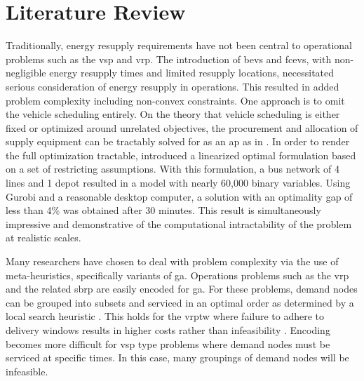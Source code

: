 \section{Literature Review}

Traditionally, energy resupply requirements have not been central to operational problems such as the \gls{vsp} and \gls{vrp}. The introduction of \glspl{bev} and \glspl{fcev}, with non-negligible energy resupply times and limited resupply locations, necessitated serious consideration of energy resupply in operations. This resulted in added problem complexity including non-convex constraints. One approach is to omit the vehicle scheduling entirely. On the theory that vehicle scheduling is either fixed or optimized around unrelated objectives, the procurement and allocation of supply equipment can be tractably solved for as an \gls{ap} as in \cite{Foda_2023_E, Foda_2024_TP, Gkiotsalitis_2025_AE}. In order to render the full optimization tractable, \cite{Wang_2022_TRD} introduced a linearized optimal formulation based on a set of restricting assumptions. With this formulation, a bus network of 4 lines and 1 depot resulted in a model with nearly 60,000 binary variables. Using Gurobi and a reasonable desktop computer, a solution with an optimality gap of less than 4\% was obtained after 30 minutes. This result is simultaneously impressive and demonstrative of the computational intractability of the problem at realistic scales.

Many researchers have chosen to deal with problem complexity via the use of meta-heuristics, specifically variants of \gls{ga}. Operations problems such as the \gls{vrp} and the related \gls{sbrp} are easily encoded for \gls{ga}. For these problems, demand nodes can be grouped into subsets and serviced in an optimal order as determined by a local search heuristic \cite{Jozefowiez_2006_AE, Sooktip_2015_CC, Hou_2022_EL}. This holds for the \gls{vrptw} where failure to adhere to delivery windows results in higher costs rather than infeasibility \cite{Mendes_2016_ITSC, Tang_2021_ITITS, Feng_2024_ICECAI, Wang_2020_ESA}. Encoding becomes more difficult for \gls{vsp} type problems where demand nodes must be serviced at specific times. In this case, many groupings of demand nodes will be infeasible.

